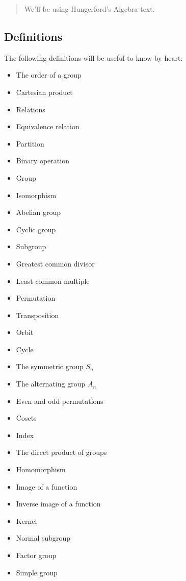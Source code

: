 \begin{quote}
We'll be using Hungerford's Algebra text.
\end{quote}

\hypertarget{definitions}{%
\subsection{Definitions}\label{definitions}}

The following definitions will be useful to know by heart:

\begin{itemize}
\tightlist
\item
  The order of a group
\item
  Cartesian product
\item
  Relations
\item
  Equivalence relation
\item
  Partition
\item
  Binary operation
\item
  Group
\item
  Isomorphism
\item
  Abelian group
\item
  Cyclic group
\item
  Subgroup
\item
  Greatest common divisor
\item
  Least common multiple
\item
  Permutation
\item
  Transposition
\item
  Orbit
\item
  Cycle
\item
  The symmetric group \(S_{n}\)
\item
  The alternating group \(A_{n}\)
\item
  Even and odd permutations
\item
  Cosets
\item
  Index
\item
  The direct product of groups
\item
  Homomorphism
\item
  Image of a function
\item
  Inverse image of a function
\item
  Kernel
\item
  Normal subgroup
\item
  Factor group
\item
  Simple group
\end{itemize}

